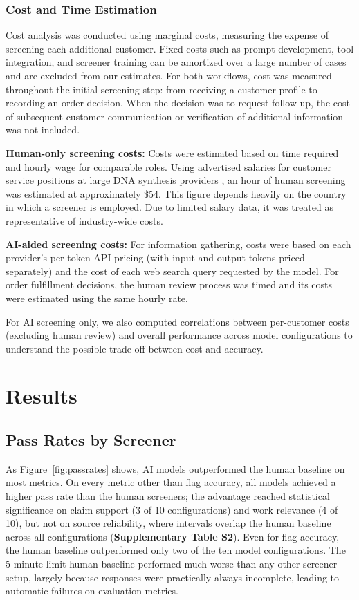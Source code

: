 \documentclass[12pt]{article}
\begin{document}
\subsubsection{Cost and Time Estimation}

Cost analysis was conducted using marginal costs, measuring the expense of screening each additional customer. Fixed costs such as prompt development, tool integration, and screener training can be amortized over a large number of cases and are excluded from our estimates. For both workflows, cost was measured throughout the initial screening step: from receiving a customer profile to recording an order decision. When the decision was to request follow-up, the cost of subsequent customer communication or verification of additional information was not included.

\textbf{Human-only screening costs:} Costs were estimated based on time required and hourly wage for comparable roles. Using advertised salaries for customer service positions at large DNA synthesis providers \citep{Glassdoor2025}, an hour of human screening was estimated at approximately \$54. This figure depends heavily on the country in which a screener is employed. Due to limited salary data, it was treated as representative of industry-wide costs.

\textbf{AI-aided screening costs:} For information gathering, costs were based on each provider’s per-token API pricing (with input and output tokens priced separately) and the cost of each web search query requested by the model. For order fulfillment decisions, the human review process was timed and its costs were estimated using the same hourly rate. 

For AI screening only, we also computed correlations between per-customer costs (excluding human review) and overall performance across model configurations to understand the possible trade-off between cost and accuracy.

\section{Results}

\subsection{Pass Rates by Screener}

As Figure~\ref{fig:passrates} shows, AI models outperformed the human baseline on most metrics. On every metric other than flag accuracy, all models achieved a higher pass rate than the human screeners; the advantage reached statistical significance on claim support (3 of 10 configurations) and work relevance (4 of 10), but not on source reliability, where intervals overlap the human baseline across all configurations (\textbf{Supplementary Table S2}). Even for flag accuracy, the human baseline outperformed only two of the ten model configurations. The 5-minute-limit human baseline performed much worse than any other screener setup, largely because responses were practically always incomplete, leading to automatic failures on evaluation metrics.
\end{document}
